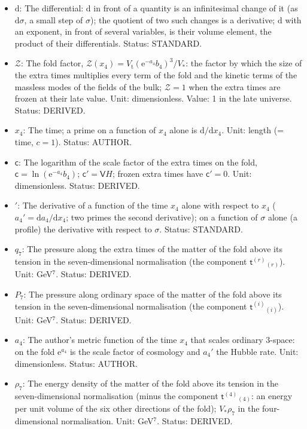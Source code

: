 \documentclass[
  10pt,
]{article}
\providecommand{\tightlist}{%
  \setlength{\itemsep}{0pt}\setlength{\parskip}{0pt}}
\begin{document}
\begin{itemize}
\tightlist
\item
  \(\mathrm{d}\): The differential: \(\mathrm{d}\) in front of a
  quantity is an infinitesimal change of it (as \(\mathrm{d}\sigma\), a
  small step of \(\sigma\)); the quotient of two such changes is a
  derivative; \(\mathrm{d}\) with an exponent, in front of several
  variables, is their volume element, the product of their
  differentials. Status: STANDARD.
\item
  \(\mathcal{Z}\): The fold factor,
  \(\mathcal{Z}(x_4) = V_{\mathrm{t}}(\mathrm{e}^{-a_4}b_4)^3/V_*\): the
  factor by which the size of the extra times multiplies every term of
  the fold and the kinetic terms of the massless modes of the fields of
  the bulk; \(\mathcal{Z} = 1\) when the extra times are frozen at their
  late value. Unit: dimensionless. Value: 1 in the late universe.
  Status: DERIVED.
\item
  \(x_4\): The time; a prime on a function of \(x_4\) alone is
  \(\mathrm{d}/\mathrm{d}x_4\). Unit: length (= time, \(c = 1\)).
  Status: AUTHOR.
\item
  \(\mathsf{c}\): The logarithm of the scale factor of the extra times
  on the fold, \(\mathsf{c} = \ln(\mathrm{e}^{-a_4}b_4)\);
  \(\mathsf{c}' = \mathsf{V}H\); frozen extra times have
  \(\mathsf{c}' = 0\). Unit: dimensionless. Status: DERIVED.
\item
  \({}'\): The derivative of a function of the time \(x_4\) alone with
  respect to \(x_4\) (\(a_4' = \mathrm{d}a_4/\mathrm{d}x_4\); two primes
  the second derivative); on a function of \(\sigma\) alone (a profile)
  the derivative with respect to \(\sigma\). Status: STANDARD.
\item
  \(q_7\): The pressure along the extra times of the matter of the fold
  above its tension in the seven-dimensional normalisation (the
  component \(\mathsf{t}^{(r)}{}_{(r)}\)). Unit: GeV\(^7\). Status:
  DERIVED.
\item
  \(P_7\): The pressure along ordinary space of the matter of the fold
  above its tension in the seven-dimensional normalisation (the
  component \(\mathsf{t}^{(i)}{}_{(i)}\)). Unit: GeV\(^7\). Status:
  DERIVED.
\item
  \(a_4\): The author's metric function of the time \(x_4\) that scales
  ordinary 3-space: on the fold \(\mathrm{e}^{a_4}\) is the scale factor
  of cosmology and \(a_4'\) the Hubble rate. Unit: dimensionless.
  Status: AUTHOR.
\item
  \(\rho_7\): The energy density of the matter of the fold above its
  tension in the seven-dimensional normalisation (minus the component
  \(\mathsf{t}^{(4)}{}_{(4)}\): an energy per unit volume of the six
  other directions of the fold); \(V_*\rho_7\) in the four-dimensional
  normalisation. Unit: GeV\(^7\). Status: DERIVED.
\end{itemize}
\end{document}
